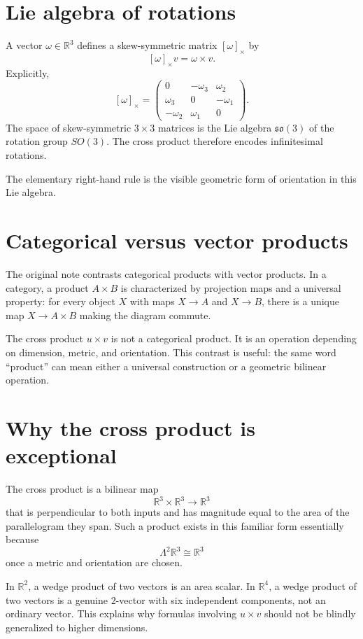 \section{Lie algebra of rotations}

A vector $\omega\in\mathbb R^3$ defines a skew-symmetric matrix $[\omega]_\times$ by
\[
  [\omega]_\times v=\omega\times v.
\]
Explicitly,
\[
  [\omega]_\times=\begin{pmatrix}
  0&-\omega_3&\omega_2\\
  \omega_3&0&-\omega_1\\
  -\omega_2&\omega_1&0
  \end{pmatrix}.
\]
The space of skew-symmetric $3\times3$ matrices is the Lie algebra $\mathfrak{so}(3)$ of the rotation group $SO(3)$.  The cross product therefore encodes infinitesimal rotations.

The elementary right-hand rule is the visible geometric form of orientation in this Lie algebra.

\section{Categorical versus vector products}

The original note contrasts categorical products with vector products.  In a category, a product $A\times B$ is characterized by projection maps and a universal property: for every object $X$ with maps $X\to A$ and $X\to B$, there is a unique map $X\to A\times B$ making the diagram commute.

The cross product $u\times v$ is not a categorical product.  It is an operation depending on dimension, metric, and orientation.  This contrast is useful: the same word ``product'' can mean either a universal construction or a geometric bilinear operation.

\section{Why the cross product is exceptional}

The cross product is a bilinear map
\[
  \mathbb R^3\times\mathbb R^3\to\mathbb R^3
\]
that is perpendicular to both inputs and has magnitude equal to the area of the parallelogram they span.  Such a product exists in this familiar form essentially because
\[
  \Lambda^2\mathbb R^3\cong \mathbb R^3
\]
once a metric and orientation are chosen.

In $\mathbb R^2$, a wedge product of two vectors is an area scalar.  In $\mathbb R^4$, a wedge product of two vectors is a genuine $2$-vector with six independent components, not an ordinary vector.  This explains why formulas involving $u\times v$ should not be blindly generalized to higher dimensions.

